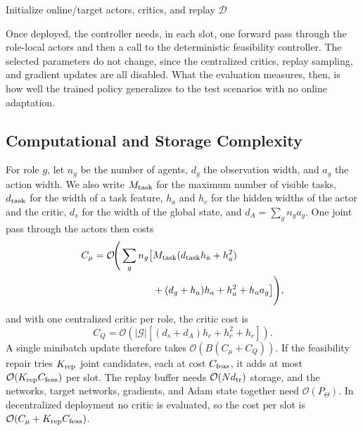\begin{algorithm}[!t]
\caption{Queue-aware domain-randomized Hybrid MADDPG}
\label{alg:dr_maddpg_new}
Initialize online/target actors, critics, and replay $\mathcal D$\;
\end{algorithm}

Once deployed, the controller needs, in each slot, one forward pass through
the role-local actors and then a call to the deterministic feasibility
controller. The selected parameters do not change, since the centralized
critics, replay sampling, and gradient updates are all disabled. What the
evaluation measures, then, is how well the trained policy generalizes to the
test scenarios with no online adaptation.

\subsection{Computational and Storage Complexity}
For role $g$, let $n_g$ be the number of agents, $d_g$ the observation width,
and $a_g$ the action width. We also write $M_{\rm task}$ for the maximum
number of visible tasks, $d_{\rm task}$ for the width of a task feature,
$h_a$ and $h_c$ for the hidden widths of the actor and the critic, $d_s$ for
the width of the global state, and $d_A=\sum_gn_ga_g$. One joint pass
through the actors then costs
\begin{align}
C_\mu=\mathcal O\!\Bigg(\sum_gn_g\big[&
M_{\rm task}(d_{\rm task}h_a+h_a^2)\nonumber\\
&+(d_g+h_a)h_a+h_a^2+h_aa_g\big]\Bigg),
\label{eq:actor_complexity_new}
\end{align}
and with one centralized critic per role, the critic cost is
\begin{equation}
C_Q=\mathcal O\!\left(|\mathcal G|
\left[(d_s+d_A)h_c+h_c^2+h_c\right]\right).
\label{eq:critic_complexity_new}
\end{equation}
A single minibatch update therefore takes $\mathcal O(B(C_\mu+C_Q))$. If the
feasibility repair tries $K_{\rm rep}$ joint candidates, each at cost
$C_{\rm feas}$, it adds at most $\mathcal O(K_{\rm rep}C_{\rm feas})$ per
slot. The replay buffer needs $\mathcal O(Nd_{\rm tr})$ storage, and the
networks, target networks, gradients, and Adam state together need
$\mathcal O(P_\Theta)$. In decentralized deployment no critic is evaluated,
so the cost per slot is $\mathcal O(C_\mu+K_{\rm rep}C_{\rm feas})$.
